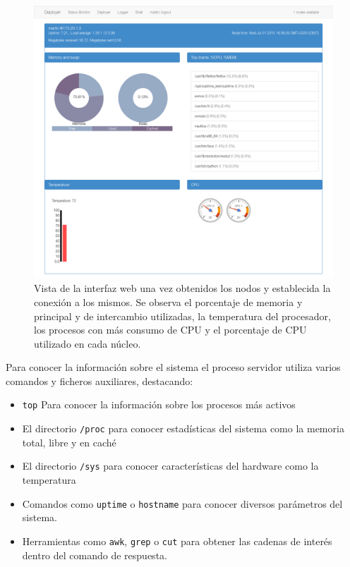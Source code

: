 \begin{figure}[H]
	\centering
	\includegraphics[height=0.5\textheight]{Chapters/Chapter5/Figures/screenshot-statusmonitor}
	\caption[Vista de la interfaz web de \textbf{Statusmonitor} una vez obtenidos los nodos]{Vista de la interfaz web una vez obtenidos los nodos y establecida la conexión a los mismos. Se observa el porcentaje de memoria y principal y de intercambio utilizadas, la temperatura del procesador, los procesos con más consumo de CPU y el porcentaje de CPU utilizado en cada núcleo.}
	\label{fig:vista_statusmonitor}
\end{figure}

Para conocer la información sobre el sistema el proceso servidor utiliza varios comandos y ficheros auxiliares, destacando:

\begin{itemize}
	\item \texttt{top} Para conocer la información sobre los procesos más activos
	\item El directorio \texttt{/proc} para conocer estadísticas del sistema como la memoria total, libre y en caché
	\item El directorio \texttt{/sys} para conocer características del hardware como la temperatura
	\item Comandos como \texttt{uptime} o \texttt{hostname} para conocer diversos parámetros del sistema.
	\item Herramientas como \texttt{awk}, \texttt{grep} o \texttt{cut} para obtener las cadenas de interés dentro del comando de respuesta.
\end{itemize}

